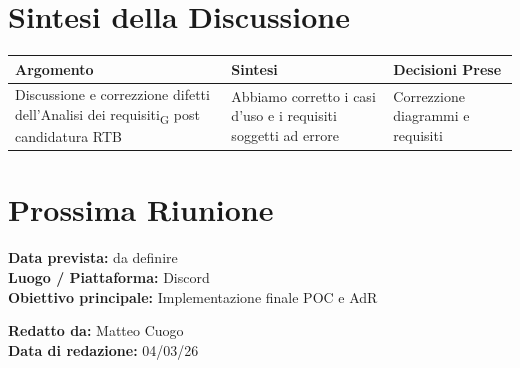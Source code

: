 \documentclass[a4paper,12pt]{article}
\newcommand{\gls}[1]{#1\textsubscript{G}}
\begin{document}
\section*{ Sintesi della Discussione}

\begin{longtable}{|p{}|p{}|p{}|}
\hline
\textbf{Argomento} & \textbf{Sintesi} & \textbf{Decisioni Prese} \\ \hline
Discussione e correzzione difetti dell'\gls{Analisi dei requisiti} post candidatura RTB & Abbiamo corretto i casi d'uso e i requisiti soggetti ad errore & Correzzione diagrammi e requisiti \\ \hline
\end{longtable}

\section*{ Prossima Riunione}
\textbf{Data prevista:} da definire \\
\textbf{Luogo / Piattaforma:} Discord \\
\textbf{Obiettivo principale:} Implementazione finale POC e AdR

\textbf{Redatto da:} Matteo Cuogo \\
\textbf{Data di redazione:} 04/03/26
\end{document}
